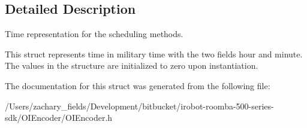 \subsection{Detailed Description}
Time representation for the scheduling methods. 

This struct represents time in military time with the two fields hour and minute. The values in the structure are initialized to zero upon instantiation. 

The documentation for this struct was generated from the following file\+:\begin{DoxyCompactItemize}
\item 
/\+Users/zachary\+\_\+fields/\+Development/bitbucket/irobot-\/roomba-\/500-\/series-\/sdk/\+O\+I\+Encoder/O\+I\+Encoder.\+h\end{DoxyCompactItemize}
